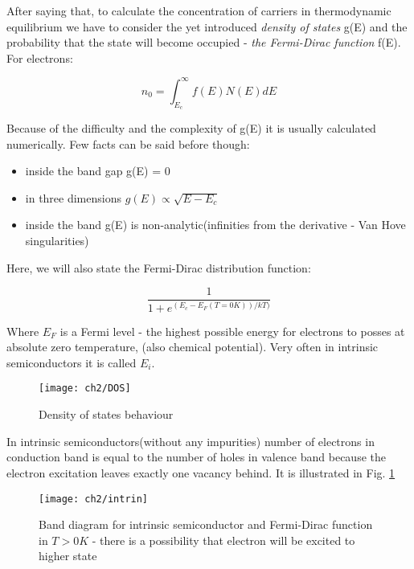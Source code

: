 After saying that, to calculate the concentration of carriers in thermodynamic equilibrium we have to consider the yet introduced \textit{density of states} g(E) and the probability that the state will become occupied - \textit{the Fermi-Dirac function} f(E). For electrons:

\begin{equation}
n_0 = \int _{E_c}^\infty f(E)N(E)dE
\end{equation}

Because of the difficulty and the complexity of g(E) it is usually calculated numerically. Few facts can be said before though:

\begin{itemize}
\item inside the band gap g(E) = 0
\item in three dimensions $g(E) \propto \sqrt{E-E_c}$
\item inside the band g(E) is non-analytic(infinities from the derivative - Van Hove singularities) 
\end{itemize}

Here, we will also state the Fermi-Dirac distribution function:

\begin{equation}
\frac{1}{1+e^{(E_c-E_F(T=0K))/kT)}}
\end{equation}

Where $E_F$ is a Fermi level - the highest possible energy for electrons to posses at absolute zero temperature, (also chemical potential). Very often in intrinsic semiconductors it is called $E_i$.

\begin{figure}
\centering
\texttt{[image: ch2/DOS]}
\caption{Density of states behaviour\cite{DOS}}
\end{figure}

In intrinsic semiconductors(without any impurities) number of electrons in conduction band is equal to the number of holes in valence band because the electron excitation leaves exactly one vacancy behind. It is illustrated in Fig. \ref{intrin}

\begin{figure}
\centering 
\texttt{[image: ch2/intrin]}
\caption{Band diagram for intrinsic semiconductor and Fermi-Dirac function in $T>0K$ - there is a possibility that electron will be excited to higher state \cite{popko}}
\label{intrin}
\end{figure}

